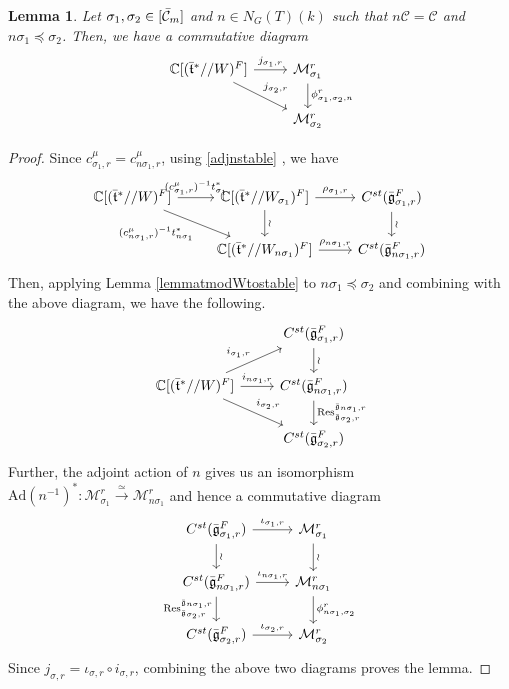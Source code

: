 \documentclass[11 pt]{article}
\numberwithin{equation}{subsection}
\newtheorem{lemma}[theorem]{Lemma}
\theoremstyle{definition}
\theoremstyle{remark}
\theoremstyle{conjecture}
\newcommand{\bt}{\bar{\mathfrak t}}
\newcommand{\bg}{\bar{\mathfrak g}}
\newcommand{\Res}{\mathrm{Res}}
\newcommand{\Ad}{\mathrm{Ad}}
\newcommand{\C}{\mathbb C}
\newcommand{\M}{\mathcal{M}}
\newcommand{\mcC}{\mathcal C}
\begin{document}
\begin{lemma}\label{lemmaadjointtmodWtoMrsigma}
    Let $\sigma_1,\sigma_2\in [\Bar{\mcC}_m]$ and $n \in N_G(T)(k)$ such that $n\mcC=\mcC$ and $ n \sigma_1 \preceq \sigma_2$. Then, we have a commutative diagram
    \begin{equation*}
    \begin{tikzcd}
        \C[(\bt^*//W)^F]\arrow{r}{j_{\sigma_1,r}} \arrow{rd}{j_{\sigma_2,r}} & \M^r_{\sigma_1}\arrow{d}{\phi^r_{\sigma_1,\sigma_2,n}}\\
        & \M^r_{\sigma_2}
    \end{tikzcd}
\end{equation*}
\end{lemma}
\begin{proof}
    Since $c^\mu_{\sigma_1,r}=c^\mu_{n\sigma_1,r}$, using \eqref{adjnstable} , we have 
    \begin{equation*}
         \begin{tikzcd}
        \C[(\bt^*//W)^F] \arrow{r}{(c^\mu_{\sigma_1,r})^{-1}t^*_{\sigma_1}} \arrow[dr,"(c^\mu_{n\sigma_1,r})^{-1}t^*_{n\sigma_1}"'] & \C[(\bt^*//W_{\sigma_1})^F]\arrow{d}{\wr} \arrow{r}{\rho_{\sigma_1,r}} & C^{st}(\bg_{\sigma_1,r}^F) \arrow{d}{\wr} \\
        &\C[(\bt^*//W_{n\sigma_1})^F] \arrow{r}{\rho_{n\sigma_1,r}} & C^{st}(\bg_{n\sigma_1,r}^F)
    \end{tikzcd}
    \end{equation*}
Then, applying  Lemma \ref{lemmatmodWtostable} to $n\sigma_1\preceq \sigma_2$ and combining with the above diagram, we have the following.
\begin{equation*}
    \begin{tikzcd}
    &  C^{st}(\bg_{\sigma_1,r}^F) \arrow{d}{\wr} \\
     \C[(\bt^*//W)^F] \arrow{ur}{i_{\sigma_1,r}} \arrow[r,"i_{n\sigma_1,r}" ]  \arrow[rd, "i_{\sigma_2,r}" ] &  C^{st}(\bg_{n\sigma_1,r}^F) \arrow{d}{\Res^{\bg_{n\sigma_1,r}}_{\bg_{\sigma_2,r}}} \\
     & C^{st}(\bg_{\sigma_2,r}^F)
     \end{tikzcd}
\end{equation*}
Further, the adjoint action of $n$ gives us an isomorphism $\Ad(n^{-1})^*:\M^r_{\sigma_1} \xrightarrow{\simeq}\M^r_{n\sigma_1}$ and hence a commutative diagram 
   \begin{equation*}
        \begin{tikzcd}
         C^{st}(\bg_{\sigma_1,r}^F) \arrow{r}{\iota_{\sigma_1,r}} \arrow{d}{\wr} &\M^r_{\sigma_1}\arrow{d}{\wr} \\
          C^{st}(\bg_{n\sigma_1,r}^F) \arrow{r}{\iota_{n\sigma_1,r}}  \arrow{d}[swap]{\Res^{\bg_{n\sigma_1,r}}_{\bg_{\sigma_2,r}}}&\M^r_{n\sigma_1}\arrow{d}{\phi^r_{n\sigma_1,\sigma_2}}\\
          C^{st}(\bg_{\sigma_2,r}^F) \arrow{r}{\iota_{\sigma_2,r}}&\M^r_{\sigma_2}
        \end{tikzcd}
    \end{equation*}
    Since $j_{\sigma,r}= \iota_{\sigma,r}\circ i_{\sigma,r} $, combining the above two diagrams proves the lemma.  
\end{proof}
\end{document}
